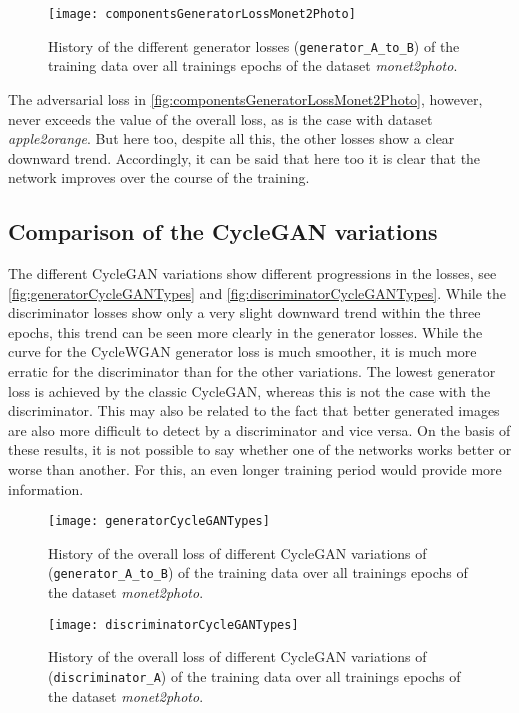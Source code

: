 \documentclass[fleqn,10pt]{SelfArx} %
\begin{document}
\begin{figure}[htb] 
	\centering 
	\texttt{[image: componentsGeneratorLossMonet2Photo]}
	\caption{History of the different generator losses (\texttt{generator\_A\_to\_B}) of the training data over all trainings epochs of the dataset \textit{monet2photo}.}
	\label{fig:componentsGeneratorLossMonet2Photo}
\end{figure}

The adversarial loss in \autoref{fig:componentsGeneratorLossMonet2Photo}, however, never exceeds the value of the overall loss, as is the case with dataset \textit{apple2orange}. But here too, despite all this, the other losses show a clear downward trend. Accordingly, it can be said that here too it is clear that the network improves over the course of the training.

\subsection{Comparison of the Cycle\ac{GAN} variations}
The different Cycle\ac{GAN} variations show different progressions in the losses, see \autoref{fig:generatorCycleGANTypes} and \autoref{fig:discriminatorCycleGANTypes}. While the discriminator losses show only a very slight downward trend within the three epochs, this trend can be seen more clearly in the generator losses. While the curve for the Cycle\ac{WGAN} generator loss is much smoother, it is much more erratic for the discriminator than for the other variations. The lowest generator loss is achieved by the classic Cycle\ac{GAN}, whereas this is not the case with the discriminator. This may also be related to the fact that better generated images are also more difficult to detect by a discriminator and vice versa. On the basis of these results, it is not possible to say whether one of the networks works better or worse than another. For this, an even longer training period would provide more information. 

\begin{figure}[htb] 
	\centering 
	\texttt{[image: generatorCycleGANTypes]}
	\caption{History of the overall loss of different Cycle\ac{GAN} variations of (\texttt{generator\_A\_to\_B}) of the training data over all trainings epochs of the dataset \textit{monet2photo}.}
	\label{fig:generatorCycleGANTypes}
\end{figure}

\begin{figure}[htb] 
	\centering 
	\texttt{[image: discriminatorCycleGANTypes]}
	\caption{History of the overall loss of different Cycle\ac{GAN} variations of (\texttt{discriminator\_A}) of the training data over all trainings epochs of the dataset \textit{monet2photo}.}
	\label{fig:discriminatorCycleGANTypes}
\end{figure}
\end{document}

